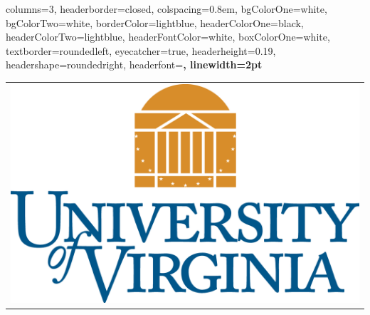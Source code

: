 \documentclass[landscape,a0paper,fontscale=0.285]{baposter} %
\begin{document}
\begin{poster}
{
columns=3,  %
headerborder=closed, %
colspacing=0.8em, %
bgColorOne=white, %
bgColorTwo=white, %
borderColor=lightblue, %
headerColorOne=black, %
headerColorTwo=lightblue, %
headerFontColor=white, %
boxColorOne=white, %
textborder=roundedleft, %
eyecatcher=true, %
headerheight=0.19\textheight, %
headershape=roundedright, %
headerfont=\Large\bf\textsc, %
linewidth=2pt %
}
%
{ 
\begin{tabular}{c}
\includegraphics[scale=0.2]{uva_logo.png} \\

\end{tabular}}
\end{poster}
\end{document}

